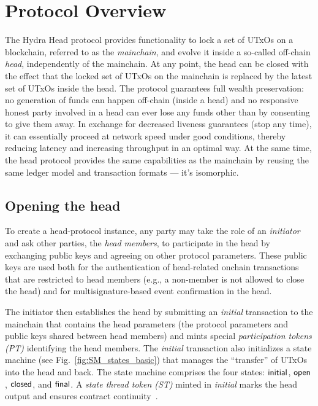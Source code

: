 \section{Protocol Overview}\label{sec:overview}


The Hydra Head protocol provides functionality to lock a set of UTxOs on a
blockchain, referred to as the \emph{mainchain}, and evolve it inside a
so-called off-chain \emph{head}, independently of the mainchain. At any point,
the head can be closed with the effect that the locked set of UTxOs on the
mainchain is replaced by the latest set of UTxOs inside the head. The protocol
guarantees full wealth preservation: no generation of funds can happen off-chain
(inside a head) and no responsive honest party involved in a head can ever lose
any funds other than by consenting to give them away. In exchange for decreased
liveness guarantees (stop any time), it can essentially proceed at network speed
under good conditions, thereby reducing latency and increasing throughput in an
optimal way. At the same time, the head protocol provides the same capabilities
as the mainchain by reusing the same ledger model and transaction formats --- it's 
isomorphic.

\subsection{Opening the head}

To create a head-protocol instance, any party may take the role of an
\emph{initiator} and ask other parties, the \emph{head members}, to participate
in the head by exchanging public keys and agreeing on other protocol parameters.
These public keys are used both for the authentication of head-related
onchain transactions that are restricted to head members (e.g., a non-member is
not allowed to close the head) and for multisignature-based  event confirmation
in the head.

The initiator then establishes the head by submitting an \emph{initial}
transaction to the mainchain that contains the head parameters (the protocol parameters and public keys shared between head members) and mints special
\emph{participation tokens (PT)} identifying the head members. The
\emph{initial} transaction also initializes a state machine (see
Fig.~\ref{fig:SM_states_basic}) that manages the ``transfer'' of UTxOs into the
head and back. The state machine comprises the four states: $\mathsf{initial}$,
$\mathsf{open}$, $\mathsf{closed}$, and $\mathsf{final}$. A \emph{state thread token (ST)} minted
in \emph{initial} marks the head output and ensures contract
continuity~\cite{eutxo}.

